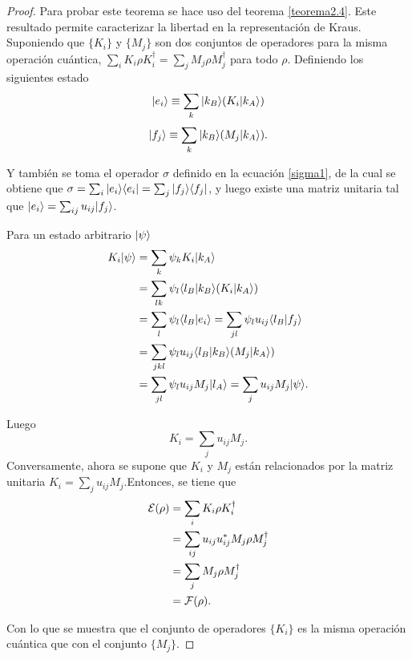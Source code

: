 \begin{proof}
Para probar este teorema se hace uso del teorema {\ref{teorema2.4}}. Este resultado permite caracterizar la libertad en la representación de Kraus. Suponiendo que $\{K_i\}$ y $\{M_j\}$ son dos conjuntos de operadores para la misma operación cuántica, $\sum_i K_i \rho K_i^\dagger= \sum_j M_j \rho M_j^\dagger$ para todo $\rho$. Definiendo los siguientes estado
\begin{equation}
    |e_i\rangle\equiv \sum_k |k_B\rangle(K_i|k_A\rangle)
\end{equation}
\begin{equation}
    |f_j\rangle\equiv \sum_k |k_B\rangle(M_j|k_A\rangle).
\end{equation}


Y también se toma el operador $\sigma$ definido en la ecuación {\ref{sigma1}}, de la cual se obtiene que $\sigma=\sum_i|e_i \rangle \langle e_i|=\sum_j |f_j\rangle \langle f_j|$, y luego existe una matriz unitaria tal que $  |e_i\rangle=\sum_{ij}u_{ij}|f_j\rangle$.

Para un estado arbitrario $|\psi\rangle$ 
\begin{equation}
    \begin{split}
        K_i|\psi\rangle&=\sum_k \psi_k K_i|k_A\rangle\\
                   &= \sum_{lk}\psi_l\langle l_B |k_B\rangle(K_i|k_A\rangle)\\
                   &=\sum_{l}\psi_l\langle l_B| e_i\rangle=\sum_{jl}\psi_l u_{ij}\langle l_B|f_j\rangle\\
                   &=\sum_{jkl}\psi_l u_{ij}\langle l_B|k_B\rangle(M_j|k_A\rangle)\\
                   &=\sum_{jl}\psi_l u_{ij}M_j|l_A\rangle=\sum_j u_{ij} M_j |\psi\rangle.\\
    \end{split}
\end{equation}


Luego \[K_i=\sum_j u_{ij}M_j.\] Conversamente, ahora se supone que $K_i$ y $M_j$ están relacionados por la matriz unitaria $K_i=\sum_j u_{ij}M_j$.Entonces, se tiene que
\begin{equation}
    \begin{split}
        \mathcal{E}(\rho)&=\sum_i  K_i\rho K_i^\dagger\\
            &=\sum_{ij} u_{ij}u_{ij}^*M_j\rho M_j^\dagger\\
            &=\sum_j M_j\rho M_j^\dagger\\
            &=\mathcal{F}(\rho).
    \end{split}
\end{equation}

Con lo que se muestra que el conjunto de operadores $\{K_i\}$ es la misma operación cuántica que con el conjunto $\{M_j\}$.
\end{proof}

